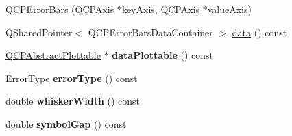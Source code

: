 \begin{DoxyCompactItemize}
\item 
\hyperlink{classQCPErrorBars_a5cdcc33e5f173780c3d657e96216e5c1}{Q\+C\+P\+Error\+Bars} (\hyperlink{classQCPAxis}{Q\+C\+P\+Axis} $\ast$key\+Axis, \hyperlink{classQCPAxis}{Q\+C\+P\+Axis} $\ast$value\+Axis)
\item 
Q\+Shared\+Pointer$<$ Q\+C\+P\+Error\+Bars\+Data\+Container $>$ \hyperlink{classQCPErrorBars_ade69711ef3f9ec10e77d121fa2ba773b}{data} () const 
\item 
\hyperlink{classQCPAbstractPlottable}{Q\+C\+P\+Abstract\+Plottable} $\ast$ {\bfseries data\+Plottable} () const \hypertarget{classQCPErrorBars_ad9e85b60a45022c1c3c88dd88693b465}{}\label{classQCPErrorBars_ad9e85b60a45022c1c3c88dd88693b465}

\item 
\hyperlink{classQCPErrorBars_a95f0220f11a72648b96480a85ce26474}{Error\+Type} {\bfseries error\+Type} () const \hypertarget{classQCPErrorBars_a05020eba90982b7d1308560edc3ff59f}{}\label{classQCPErrorBars_a05020eba90982b7d1308560edc3ff59f}

\item 
double {\bfseries whisker\+Width} () const \hypertarget{classQCPErrorBars_acb67e100878a60bbe3118baf21d3b2e9}{}\label{classQCPErrorBars_acb67e100878a60bbe3118baf21d3b2e9}

\item 
double {\bfseries symbol\+Gap} () const \hypertarget{classQCPErrorBars_a5987a45043d4cc6425438ce2b96b6972}{}\label{classQCPErrorBars_a5987a45043d4cc6425438ce2b96b6972}


\end{DoxyCompactItemize}

